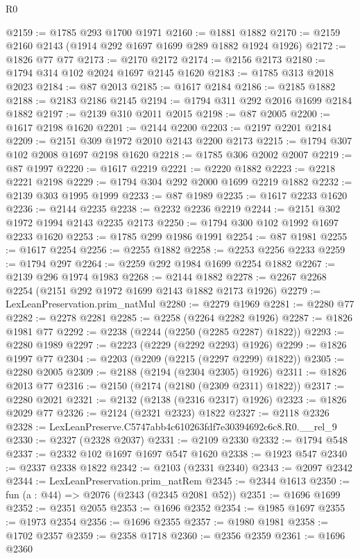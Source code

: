 \begin{lexlean}{R0}
\begin{coremodule}
@2159 := @1785 @293 @1700 @1971
@2160 := @1881 @1882
@2170 := @2159 @2160 @2143 (@1914 @292 @1697 @1699 @289 @1882 @1924 @1926)
@2172 := @1826 @77 @77
@2173 := @2170 @2172
@2174 := @2156 @2173
@2180 := @1794 @314 @102 @2024 @1697 @2145 @1620
@2183 := @1785 @313 @2018 @2023
@2184 := @87 @2013
@2185 := @1617 @2184
@2186 := @2185 @1882
@2188 := @2183 @2186 @2145
@2194 := @1794 @311 @292 @2016 @1699 @2184 @1882
@2197 := @2139 @310 @2011 @2015
@2198 := @87 @2005
@2200 := @1617 @2198 @1620
@2201 := @2144 @2200
@2203 := @2197 @2201 @2184
@2209 := @2151 @309 @1972 @2010 @2143 @2200 @2173
@2215 := @1794 @307 @102 @2008 @1697 @2198 @1620
@2218 := @1785 @306 @2002 @2007
@2219 := @87 @1997
@2220 := @1617 @2219
@2221 := @2220 @1882
@2223 := @2218 @2221 @2198
@2229 := @1794 @304 @292 @2000 @1699 @2219 @1882
@2232 := @2139 @303 @1995 @1999
@2233 := @87 @1989
@2235 := @1617 @2233 @1620
@2236 := @2144 @2235
@2238 := @2232 @2236 @2219
@2244 := @2151 @302 @1972 @1994 @2143 @2235 @2173
@2250 := @1794 @300 @102 @1992 @1697 @2233 @1620
@2253 := @1785 @299 @1986 @1991
@2254 := @87 @1981
@2255 := @1617 @2254
@2256 := @2255 @1882
@2258 := @2253 @2256 @2233
@2259 := @1794 @297
@2264 := @2259 @292 @1984 @1699 @2254 @1882
@2267 := @2139 @296 @1974 @1983
@2268 := @2144 @1882
@2278 := @2267 @2268 @2254 (@2151 @292 @1972 @1699 @2143 @1882 @2173 @1926)
@2279 := LexLeanPreservation.prim_natMul
@2280 := @2279 @1969
@2281 := @2280 @77
@2282 := @2278 @2281
@2285 := @2258 (@2264 @2282 @1926)
@2287 := @1826 @1981 @77
@2292 := @2238 (@2244 (@2250 (@2285 @2287) @1822))
@2293 := @2280 @1989
@2297 := @2223 (@2229 (@2292 @2293) @1926)
@2299 := @1826 @1997 @77
@2304 := @2203 (@2209 (@2215 (@2297 @2299) @1822))
@2305 := @2280 @2005
@2309 := @2188 (@2194 (@2304 @2305) @1926)
@2311 := @1826 @2013 @77
@2316 := @2150 (@2174 (@2180 (@2309 @2311) @1822))
@2317 := @2280 @2021
@2321 := @2132 (@2138 (@2316 @2317) @1926)
@2323 := @1826 @2029 @77
@2326 := @2124 (@2321 @2323) @1822
@2327 := @2118 @2326
@2328 := LexLeanPreserve.C5747abb4c610263fdf7e30394692c6c8.R0.__rel_9
@2330 := @2327 (@2328 @2037)
@2331 := @2109 @2330
@2332 := @1794 @548
@2337 := @2332 @102 @1697 @1697 @547 @1620
@2338 := @1923 @547
@2340 := @2337 @2338 @1822
@2342 := @2103 (@2331 @2340)
@2343 := @2097 @2342
@2344 := LexLeanPreservation.prim_natRem
@2345 := @2344 @1613
@2350 := fun (a : @44) => @2076 (@2343 (@2345 @2081 @52))
@2351 := @1696 @1699
@2352 := @2351 @2055
@2353 := @1696 @2352
@2354 := @1985 @1697
@2355 := @1973 @2354
@2356 := @1696 @2355
@2357 := @1980 @1981
@2358 := @1702 @2357
@2359 := @2358 @1718
@2360 := @2356 @2359
@2361 := @1696 @2360

\end{coremodule}
\end{lexlean}
